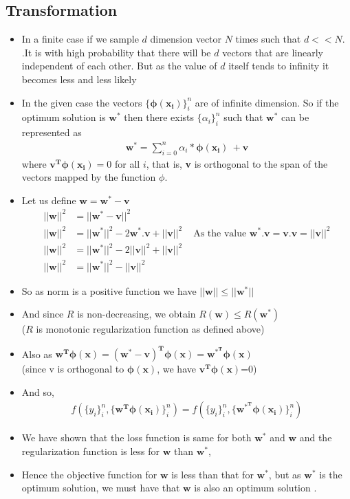 \documentclass[12pt]{article}
\begin{document}
\subsection{Transformation}
\begin{itemize}
    \item 
In a finite case if we sample $d$ dimension vector $N$ times such that $d << N$.
.It is with high probability that there will be $d$ vectors that are linearly independent of each other. But as the value of $d$ itself tends to infinity it becomes less and less likely

    \item
In the given case the vectors $\{\bm{\phi(x_i)}\}_i^n$ are of infinite dimension.
So if the optimum solution is $\bm{w^*}$ then there exists $\{\alpha_i\}_i^n$ such that $\bm{w^*}$ can be represented as 
\begin{align*}
    \bm{w^*} = \sum_{i = 0}^n \alpha_{i}*\bm{\phi(x_i)}\ + \bm{v}
\end{align*}
where $\bm{v^T\phi(x_i)} = 0$ for all $i$, that is, \textbf{v} is orthogonal to the span of the vectors mapped by the function $\phi$.

    \item
Let us define $\bm{w} = \bm{w^*} - \bm{v}$ 
\begin{align*}
    ||\bm{w}||^2 &= ||\bm{w^*} - \bm{v}||^2 \\
    ||\bm{w}||^2 &= ||\bm{w^*}||^2 - 2\bm{w^*}.\bm{v} + ||\bm{v}||^2 
    &\text{  As the value } \bm{w^*}.\bm{v} = \bm{v}.\bm{v} = ||\bm{v}||^2 \\
    ||\bm{w}||^2 &= ||\bm{w^*}||^2 - 2||\bm{v}||^2 + ||\bm{v}||^2 \\
    ||\bm{w}||^2 &= ||\bm{w^*}||^2 - ||\bm{v}||^2  
\end{align*}

    \item So as norm is a positive function we have $||\bm{w}|| \le ||\bm{w^*}||$
    \item And since $R$ is non-decreasing, we obtain $R(\bm{w}) \le R(\bm{w^*})$\\ ($R$ is monotonic regularization function as defined above)
    \item Also as $\bm{w^T\phi(x)} = (\bm{w^*} - \bm{v})^{\bm{T}}\bm{\phi(x)} = \bm{w^{*^T}\phi(x)}$ \\
    (since v is orthogonal to $\bm{\phi(x)}$, we have $\bm{v^T\phi(x)}$=0)
    \item And so,
\begin{align*}
    f(\{y_i\}_i^n , \{\bm{w^T\phi(x_i)}\}_i^n) = f(\{y_i\}_i^n , \{\bm{w^{*^T}\phi(x_i)}\}_i^n)
\end{align*}
    \item We have shown that the loss function is same for both $\bm{w^*}$ and $\bm{w}$ and the regularization function is less for $\bm{w}$ than $\bm{w^*}$,
    \item Hence  the objective function for $\bm{w}$ is less than that for $\bm{w^*}$, but as $\bm{w^*}$ is the optimum solution, we must have that $\bm{w}$ is also an optimum solution .


\end{itemize}
\end{document}
